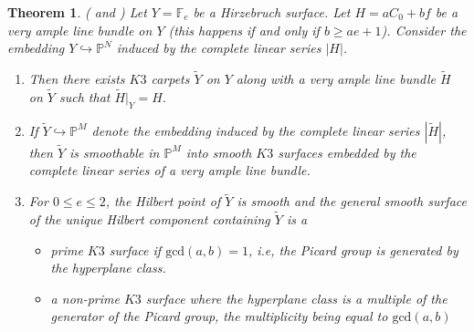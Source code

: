 \documentclass[11pt,twoside]{amsart}
\theoremstyle{plain}
\numberwithin{equation}{section}
\newtheorem{theorem}{Theorem}[section]
\theoremstyle{definition}
\begin{document}
\begin{theorem}\label{degeneration into $K3$ carpets}(\cite[Theorem $4.1$]{BMR21} and \cite[Theorem $2.9$]{GP97})
Let $Y = \mathbb{F}_e$ be a Hirzebruch surface. Let $H = aC_0+bf$ be a very ample line bundle on $Y$ (this happens if and only if $b \geq ae+1$). Consider the embedding $Y \hookrightarrow \mathbb{P}^N$ induced by the complete linear series $|H|$.  
\begin{enumerate}
    \item Then there exists $K3$ carpets $\widetilde{Y}$ on $Y$ along with a very ample line bundle $\widetilde{H}$ on $\widetilde{Y}$ such that $\widetilde{H}|_Y = H$.

    \item If $\widetilde{Y} \hookrightarrow \mathbb{P}^M$ denote the embedding induced by the complete linear series $|\widetilde{H}|$, then $\widetilde{Y}$ is smoothable in $\mathbb{P}^M$ into smooth $K3$ surfaces embedded by the complete linear series of a very ample line bundle.

    \item For $0 \leq e \leq 2$, the Hilbert point of $\widetilde{Y}$ is smooth and the general smooth surface of the unique Hilbert component containing $\widetilde{Y}$ is a 
    \begin{itemize}
        \item[(a)] prime $K3$ surface if $\textrm{gcd}(a,b) = 1$, i.e, the Picard group is generated by the hyperplane class.
        \item[(b)] a non-prime $K3$ surface where the hyperplane class is a multiple of the generator of the Picard group, the multiplicity being equal to $\textrm{gcd}(a,b)$
    \end{itemize}
\end{enumerate}
\end{theorem}
\end{document}
